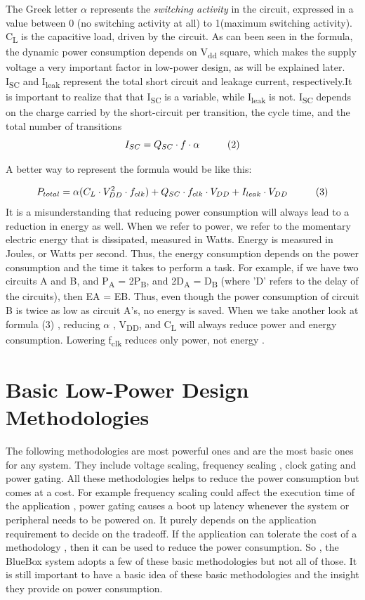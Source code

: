 The Greek letter $\alpha$ represents the \textit{switching activity} in the circuit, expressed in a value between 0 (no switching activity at all) to 1(maximum switching activity). C\textsubscript{L} is the capacitive load, driven by the circuit. As can been seen in the formula, the dynamic
power consumption depends on V\textsubscript{dd} square, which makes the supply voltage a very
important factor in low-power design, as will be explained later. I\textsubscript{SC} and I\textsubscript{leak} represent
the total short circuit and leakage current, respectively.It is important to realize that
that I\textsubscript{SC} is a variable, while I\textsubscript{leak} is not. I\textsubscript{SC} depends on the charge carried by the
short-circuit per transition, the cycle time, and the total number of transitions
\[I_{SC} = Q_{SC}  \cdot  f \cdot \alpha    \hspace{10mm} (2) \] 

A better way to represent the formula would be like this:

\[P_{total} = \alpha(C_L \cdot V_{DD}^2 \cdot f_{clk}) +  Q_{SC}  \cdot  f_{clk} \cdot V_{DD} + I_{leak} \cdot V_{DD}    \hspace{10mm} (3) \]
It is a misunderstanding that reducing power consumption will always lead to a
reduction in energy as well. When we refer to power, we refer to the momentary
electric energy that is dissipated, measured in Watts. Energy is measured in Joules, or Watts per second. Thus, the energy consumption depends on the power consumption and the time it takes to perform a task. For example, if we have two circuits A and B, and P\textsubscript{A} = 2P\textsubscript{B}, and 2D\textsubscript{A} = D\textsubscript{B} (where ’D’ refers to the delay of the circuits), then EA = EB. Thus, even though the power consumption of circuit B is twice as low as circuit A’s, no energy is saved. When we take another look at formula (3) , reducing $\alpha$ , V\textsubscript{DD}, and C\textsubscript{L} will always reduce power and energy consumption. Lowering f\textsubscript{clk} reduces
only power, not energy \cite{PowerAwareArchitecting}.

\section{Basic Low-Power Design Methodologies}
 The following methodologies are most powerful ones and are the most basic ones for any system. They include voltage scaling, frequency scaling , clock gating and power gating. All these methodologies helps to reduce the power consumption but comes at a cost. For example frequency scaling could affect the execution time of the application , power gating causes a boot up latency whenever the system or peripheral needs to be powered on. It purely depends on the application requirement to decide on the tradeoff. If the application can tolerate the cost of a methodology , then it can be used to reduce the power consumption. So , the BlueBox system adopts a few of these basic methodologies but not all of those. It is still important to have a basic idea of these basic methodologies and the insight they provide on power consumption. 
 
